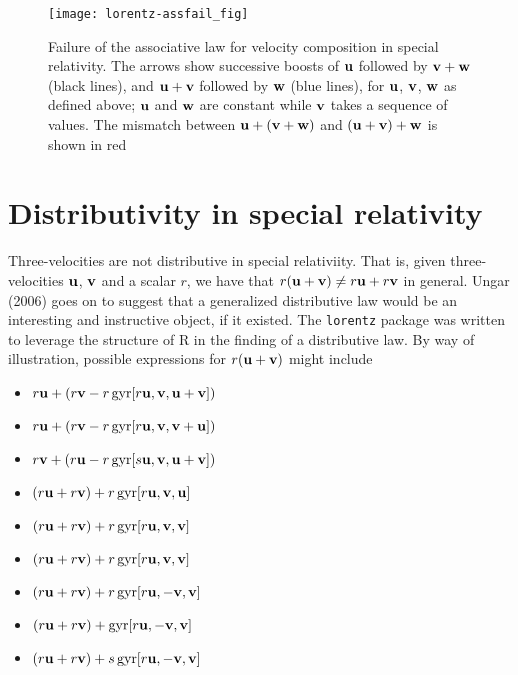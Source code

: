 \documentclass[ijoc,nonblindrev]{informs3} %
\begin{document}
\begin{figure}[htbp]
  \begin{center}
\texttt{[image: lorentz-assfail\_fig]}
\caption{Failure of the associative law \label{assfail} for velocity
  composition in special relativity.  The arrows show successive
  boosts of $\mathbf u$ followed by $\mathbf v+\mathbf w$ (black lines), and $\mathbf u+\mathbf v$
  followed by $\mathbf w$ (blue lines), for $\mathbf u$, $\mathbf v$, $\mathbf w$ as defined
  above; $\mathbf u$ and $\mathbf w$ are constant while $\mathbf v$ takes a sequence of
  values. The mismatch between $\mathbf u+\left(\mathbf v+\mathbf w\right)$ and
  $\left(\mathbf u+\mathbf v\right)+\mathbf w$ is shown in red}
  \end{center}
\end{figure}


\section{Distributivity in special relativity}

Three-velocities are not distributive in special relativiity.  That
is, given three-velocities $\mathbf u$, $\mathbf v$ and a scalar $r$, we have that
$r(\mathbf u+\mathbf v)\neq r\mathbf u+r\mathbf v$ in general.  Ungar (2006) goes on to
suggest that a generalized distributive law would be an interesting
and instructive object, if it existed.  The {\tt lorentz} package was
written to leverage the structure of R in the finding of a
distributive law.  By way of illustration, possible expressions for 
$r(\mathbf u+\mathbf v)$ might include

\begin{itemize}
\item $r\mathbf u  + (r\mathbf v  - r\operatorname{gyr}[r\mathbf u, \mathbf v,\mathbf u+\mathbf v])$
\item $r\mathbf u  + (r\mathbf v  - r\operatorname{gyr}[r\mathbf u, \mathbf v,\mathbf v+\mathbf u])$
\item $r\mathbf v  + (r\mathbf u  - r\operatorname{gyr}[s\mathbf u, \mathbf v,\mathbf u+\mathbf v])$
\item $(r\mathbf u + r\mathbf v)  + r\operatorname{gyr}[r\mathbf u, \mathbf v,\mathbf u]$
\item $(r\mathbf u + r\mathbf v)  + r\operatorname{gyr}[r\mathbf u, \mathbf v,\mathbf v]$
\item $(r\mathbf u + r\mathbf v)  + r\operatorname{gyr}[r\mathbf u, \mathbf v,\mathbf v]$
\item $(r\mathbf u + r\mathbf v)  + r\operatorname{gyr}[r\mathbf u,-\mathbf v,\mathbf v]$
\item $(r\mathbf u + r\mathbf v)  +   \operatorname{gyr}[r\mathbf u,-\mathbf v,\mathbf v]$
\item $(r\mathbf u + r\mathbf v)  + s\operatorname{gyr}[r\mathbf u,-\mathbf v,\mathbf v]$
\end{itemize}
\end{document}

